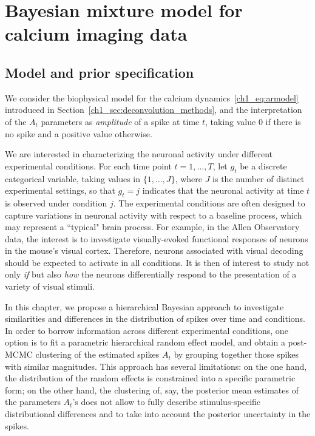 \section{Bayesian mixture model for calcium imaging data}
\subsection{Model and prior specification}
\label{s:model}

We consider the biophysical model for the calcium dynamics~\eqref{ch1_eq:armodel} introduced in Section~\ref{ch1_sec:deconvolution_methods}, and the interpretation of the $A_t$ parameters as \textit{amplitude} of a spike at time $t$, taking value $0$ if there is no spike and a positive value otherwise.

We are interested in characterizing the neuronal activity under different experimental conditions. For each time point $t=1,\dots,T$, let $g_t$ be a discrete categorical variable, taking values in $\{1,\dots, J\}$, where $J$ is the number of distinct experimental settings, so that $g_t=j$ indicates that the neuronal activity at time $t$ is observed under condition $j$. The experimental conditions are often designed to capture variations in neuronal activity with respect to a baseline process, which may represent a ``typical" brain process. For example, in the Allen Observatory data, the interest is to investigate visually-evoked functional responses of neurons in the mouse's visual cortex. Therefore, neurons associated with visual decoding should be expected to activate in all conditions. It is then of interest to study not only \textit{if} but also \textit{how} the neurons differentially respond to the presentation of a variety of visual stimuli. 

In this chapter, we propose a hierarchical Bayesian approach to investigate similarities and differences in the distribution of spikes over time and conditions. In order to borrow information across different experimental conditions, one option is to fit a parametric hierarchical random effect model, and obtain a post-MCMC clustering of the estimated spikes $A_t$ by grouping together those spikes with similar magnitudes. This approach has several limitations: on the one hand, the distribution of the random effects is constrained into a specific parametric form; on the other hand, the clustering of, say, the posterior mean estimates of the parameters $A_t$'s does not allow to fully describe stimulus-specific distributional differences and to take into account the posterior uncertainty in the spikes.

